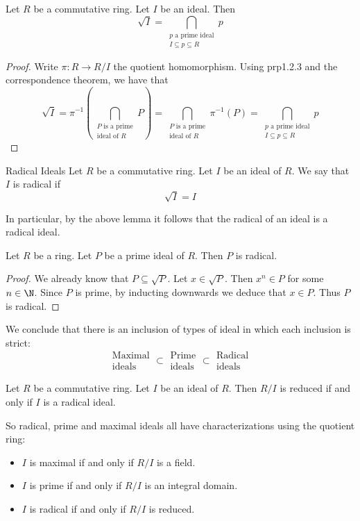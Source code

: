 \documentclass[a4paper]{article}
\begin{document}
\begin{prp}{}{} Let $R$ be a commutative ring. Let $I$ be an ideal. Then $$\sqrt{I}=\bigcap_{\substack{p\text{ a prime ideal}\\I\subseteq p\subseteq R}}p$$ 
\begin{proof}
Write $\pi:R\to R/I$ the quotient homomorphism. Using prp1.2.3 and the correspondence theorem, we have that $$\sqrt{I}=\pi^{-1}\left(\bigcap_{\substack{P\text{ is a prime}\\\text{ideal of }R}}P\right)=\bigcap_{\substack{P\text{ is a prime}\\\text{ideal of }R}}\pi^{-1}(P)=\bigcap_{\substack{p\text{ a prime ideal}\\I\subseteq p\subseteq R}}p$$
\end{proof}
\end{prp}

\begin{defn}{Radical Ideals}{} Let $R$ be a commutative ring. Let $I$ be an ideal of $R$. We say that $I$ is radical if $$\sqrt{I}=I$$
\end{defn}

In particular, by the above lemma it follows that the radical of an ideal is a radical ideal. 

\begin{lmm}{}{} Let $R$ be a ring. Let $P$ be a prime ideal of $R$. Then $P$ is radical. 
\begin{proof}
We already know that $P\subseteq\sqrt{P}$. Let $x\in\sqrt{P}$. Then $x^n\in P$ for some $n\in\N$. Since $P$ is prime, by inducting downwards we deduce that $x\in P$. Thus $P$ is radical. 
\end{proof}
\end{lmm}

We conclude that there is an inclusion of types of ideal in which each inclusion is strict: $$\substack{\text{Maximal}\\\text{ideals}}\subset\substack{\text{Prime}\\\text{ideals}}\subset\substack{\text{Radical}\\\text{ideals}}$$

\begin{prp}{}{} Let $R$ be a commutative ring. Let $I$ be an ideal of $R$. Then $R/I$ is reduced if and only if $I$ is a radical ideal. 
\end{prp}

So radical, prime and maximal ideals all have characterizations using the quotient ring: 
\begin{itemize}
\item $I$ is maximal if and only if $R/I$ is a field. 
\item $I$ is prime if and only if $R/I$ is an integral domain. 
\item $I$ is radical if and only if $R/I$ is reduced. 
\end{itemize}
\end{document}
